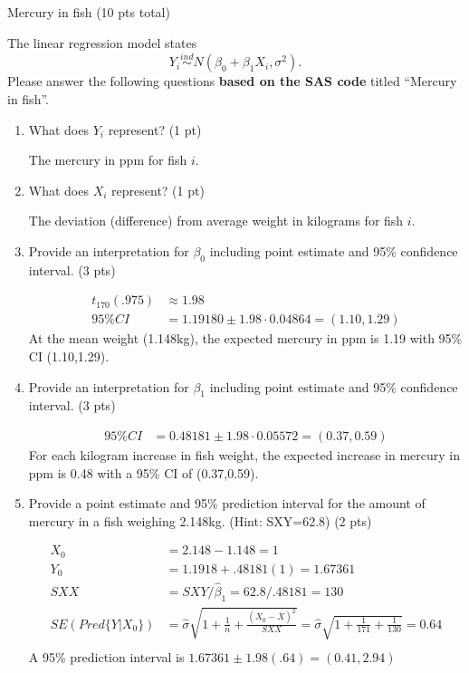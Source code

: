 \documentclass[10pt,draft]{article}
\newcommand{\bigbrk}{\vspace*{2in}}
\newcommand{\shortcorrect}[1]{{\color{red} #1}}
\newcommand{\longcorrect}[2][\bigbrk]{{\color{red} #2}}
\newcommand{\shortcorrect}[1]{{\phantom{33.33}}}
\newcommand{\longcorrect}[2][\bigbrk]{#1}
\begin{document}
\newpage
\noindent \begin{Large}Mercury in fish  (10 pts total) \end{Large}

\bigskip

\noindent The linear regression model states 
\[ Y_i \stackrel{ind}{\sim} N(\beta_0+\beta_1 X_i,\sigma^2). \]
Please answer the following questions {\bf based on the SAS code} titled ``Mercury in fish''.

\begin{enumerate}
\item What does $Y_i$ represent? (1 pt)

\shortcorrect{The mercury in ppm for fish $i$.}

\item What does $X_i$ represent? (1 pt)

\shortcorrect{The deviation (difference) from average weight in kilograms for fish $i$.} 

\item Provide an interpretation for $\beta_0$ including point estimate and 95\% confidence interval. (3 pts)

\longcorrect{
\begin{align*}
t_{170}(.975) &\approx 1.98 \\
95\% CI &= 1.19180 \pm 1.98\cdot 0.04864 = (1.10,1.29)
\end{align*}
At the mean weight (1.148kg), the expected mercury in ppm is 1.19 with 95\% CI (1.10,1.29).
}

\item Provide an interpretation for $\beta_1$ including point estimate and 95\% confidence interval. (3 pts)

\longcorrect{
\begin{align*}
95\% CI &= 0.48181 \pm 1.98\cdot 0.05572 = (0.37,0.59)
\end{align*}
For each kilogram increase in fish weight, the expected increase in mercury in ppm is 0.48 with a 95\% CI of (0.37,0.59).
}

\item Provide a point estimate and 95\% prediction interval for the amount of mercury in a fish weighing 2.148kg. (Hint: SXY=62.8) (2 pts)

\longcorrect{
\begin{align*}
X_0 &= 2.148-1.148=1 \\
Y_0 &= 1.1918+.48181(1)= 1.67361\\
SXX &= SXY/\hat{\beta}_1 = 62.8/.48181 = 130 \\
SE(Pred\{Y|X_0\}) &= \hat{\sigma}\sqrt{1+\frac{1}{n} + \frac{(X_0-\overline{X})^2}{SXX}}= \hat{\sigma}\sqrt{1+\frac{1}{171} + \frac{1}{130}} = 0.64\\
\end{align*}
A 95\% prediction interval is $1.67361\pm 1.98 (.64) = (0.41,2.94)$
}

\end{enumerate}
\end{document}
